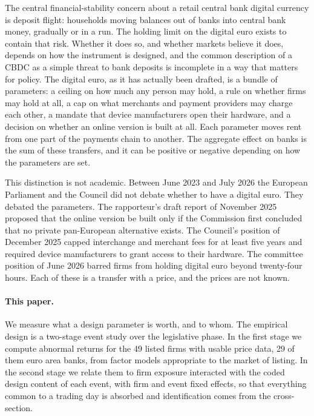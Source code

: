 \documentclass[11pt]{article}
\theoremstyle{plain}\newtheorem{proposition}{Proposition}
\begin{document}
The central financial-stability concern about a retail central bank digital currency is deposit flight: households moving balances out of banks into central bank money, gradually or in a run. The holding limit on the digital euro exists to contain that risk. Whether it does so, and whether markets believe it does, depends on how the instrument is designed, and the common description of a CBDC as a simple threat to bank deposits is incomplete in a way that matters for policy. The digital euro, as it has actually been drafted, is a bundle of parameters: a ceiling on how much any person may hold, a rule on whether firms may hold at all, a cap on what merchants and payment providers may charge each other, a mandate that device manufacturers open their hardware, and a decision on whether an online version is built at all. Each parameter moves rent from one part of the payments chain to another. The aggregate effect on banks is the sum of these transfers, and it can be positive or negative depending on how the parameters are set.

This distinction is not academic. Between June 2023 and July 2026 the European Parliament and the Council did not debate whether to have a digital euro. They debated the parameters. The rapporteur's draft report of November 2025 proposed that the online version be built only if the Commission first concluded that no private pan-European alternative exists. The Council's position of December 2025 capped interchange and merchant fees for at least five years and required device manufacturers to grant access to their hardware. The committee position of June 2026 barred firms from holding digital euro beyond twenty-four hours. Each of these is a transfer with a price, and the prices are not known.

\paragraph{This paper.} We measure what a design parameter is worth, and to whom. The empirical design is a two-stage event study over the legislative phase. In the first stage we compute abnormal returns for the 49 listed firms with usable price data, 29 of them euro area banks, from factor models appropriate to the market of listing. In the second stage we relate them to firm exposure interacted with the coded design content of each event, with firm and event fixed effects, so that everything common to a trading day is absorbed and identification comes from the cross-section.
\end{document}
